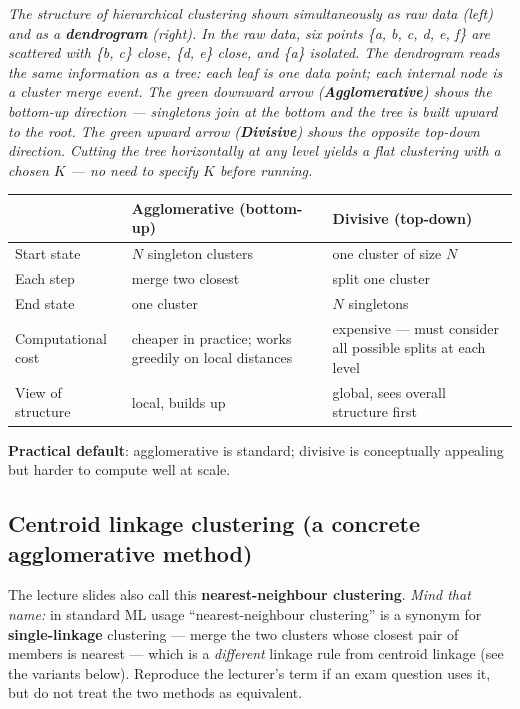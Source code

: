 \documentclass[11pt, a4paper]{article}
\newcommand{\thead}[1]{\textbf{#1}}
\begin{document}
\begin{center}

\footnotesize\textit{The structure of hierarchical clustering shown simultaneously as raw data (left) and as a \textbf{dendrogram} (right). In the raw data, six points \{a, b, c, d, e, f\} are scattered with \{b, c\} close, \{d, e\} close, and \{a\} isolated. The dendrogram reads the same information as a tree: each leaf is one data point; each internal node is a cluster merge event. The green downward arrow (\textbf{Agglomerative}) shows the bottom-up direction --- singletons join at the bottom and the tree is built upward to the root. The green upward arrow (\textbf{Divisive}) shows the opposite top-down direction. Cutting the tree horizontally at any level yields a flat clustering with a chosen $K$ --- no need to specify $K$ before running.}
\end{center}

\begin{tabularx}{\linewidth}{@{}lXX@{}}
\toprule
& \thead{Agglomerative (bottom-up)} & \thead{Divisive (top-down)} \\
\midrule
Start state    & $N$ singleton clusters & one cluster of size $N$ \\
Each step      & merge two closest      & split one cluster \\
End state      & one cluster            & $N$ singletons \\
Computational cost & cheaper in practice; works greedily on local distances & expensive — must consider all possible splits at each level \\
View of structure & local, builds up    & global, sees overall structure first \\
\bottomrule
\end{tabularx}

\textbf{Practical default}: agglomerative is standard; divisive is conceptually appealing but harder to compute well at scale.

\subsection{Centroid linkage clustering (a concrete agglomerative method)}

The lecture slides also call this \textbf{nearest-neighbour clustering}. \emph{Mind that name:} in standard ML usage ``nearest-neighbour clustering'' is a synonym for \textbf{single-linkage} clustering --- merge the two clusters whose closest pair of members is nearest --- which is a \emph{different} linkage rule from centroid linkage (see the variants below). Reproduce the lecturer's term if an exam question uses it, but do not treat the two methods as equivalent.
\end{document}
